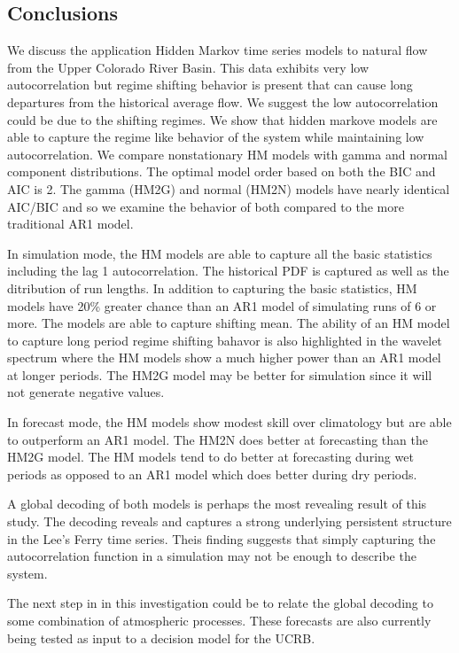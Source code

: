 \documentclass[wrr]{AGUTeX}
\begin{document}
\begin{article}
\section{Conclusions}

We discuss the application Hidden Markov time series models to natural flow from the Upper Colorado River Basin. This data exhibits very low autocorrelation but regime shifting behavior is present that can cause long departures from the historical average flow. We suggest the low autocorrelation could be due to the shifting regimes.  We show that hidden markove models are able to capture the regime like behavior of the system while maintaining low autocorrelation.  We compare nonstationary HM models with gamma and normal component distributions.  The optimal model order based on both the BIC and AIC is 2.  The gamma (HM2G) and normal (HM2N) models have nearly identical AIC/BIC and so we examine the behavior of both compared to the more traditional AR1 model. 

In simulation mode, the HM models are able to capture all the basic statistics including the lag 1 autocorrelation.  The historical PDF is captured as well as the ditribution of run lengths.  In addition to capturing the basic statistics, HM models have 20\% greater chance than an AR1 model of simulating runs of 6 or more.  The models are able to capture shifting mean.  The ability of an HM model to capture long period regime shifting bahavor is also highlighted in the wavelet spectrum where the HM models show a much higher power than an AR1 model at longer periods.  The HM2G model may be better for simulation since it will not generate negative values.

In forecast mode, the HM models show modest skill over climatology but are able to outperform an AR1 model. The HM2N does better at forecasting than the HM2G model.  The HM models tend to do better at forecasting during wet periods as opposed to an AR1 model which does better during dry periods. 

A global decoding of both models is perhaps the most revealing result of this study. The decoding reveals and captures a strong underlying persistent structure in the Lee's Ferry time series.  Theis finding suggests that simply capturing the autocorrelation function in a simulation may not be enough to describe the system.  

The next step in in this investigation could be to relate the global decoding to some combination of atmospheric processes.  These forecasts are also currently being tested as input to a decision model for the UCRB. 



\end{article}
\end{document}
